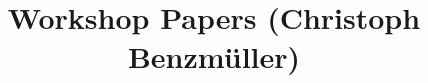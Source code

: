 \documentclass{article}
\begin{document}
\title{Workshop Papers (Christoph Benzm{\"u}ller)}
\maketitle
\nocite{*}

%

\end{document}
